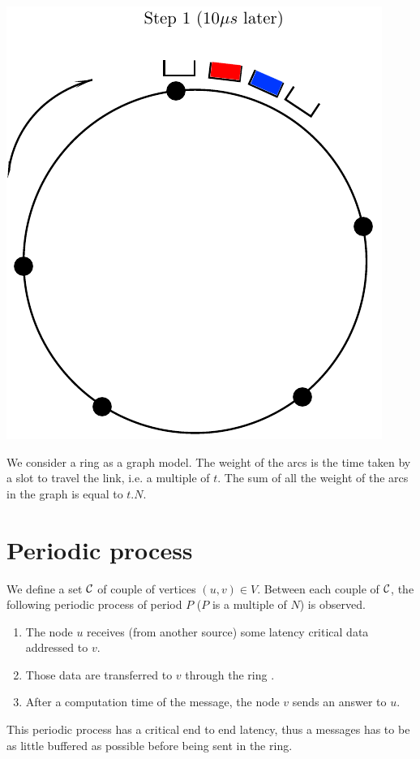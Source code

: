 \documentclass[a4paper,10pt]{article}
\begin{document}
\begin{center}
      \includegraphics[scale=0.5]{anneau2.pdf}
  
\end{center}

We consider a ring as a graph model. The weight of the arcs is the time taken by a slot to travel the link, i.e. a multiple of $t$. The sum of all the weight of the arcs in the graph is equal to $t.N$.

\section*{Periodic process}
We define a set $\cal C$ of couple of vertices $(u,v) \in V$. Between each couple of $\cal C$, the following periodic process of period $P$ ($P$ is a multiple of $N$) is observed.
\begin{enumerate}
 \item The node $u$ receives (from another source) some latency critical data addressed to $v$.
 \item Those data are transferred to $v$ through the ring .
 \item After a computation time of the message, the node $v$ sends an answer to $u$.
\end{enumerate}
 This periodic process has a critical end to end latency, thus a messages has to be as little buffered as possible before being sent in the ring.
 
\end{document}

